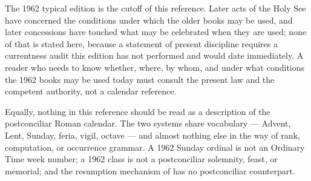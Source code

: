 The 1962 typical edition is the cutoff of this reference. Later acts of the Holy See have
concerned the conditions under which the older books may be used, and later concessions have
touched what may be celebrated when they are used; none of that is stated here, because a
statement of present discipline requires a currentness audit this edition has not performed and
would date immediately. A reader who needs to know whether, where, by whom, and under what
conditions the 1962 books may be used today must consult the present law and the competent
authority, not a calendar reference.

Equally, nothing in this reference should be read as a description of the postconciliar Roman
calendar. The two systems share vocabulary — Advent, Lent, Sunday, feria, vigil, octave — and
almost nothing else in the way of rank, computation, or occurrence grammar. A 1962 Sunday
ordinal is not an Ordinary Time week number; a 1962 class is not a postconciliar solemnity,
feast, or memorial; and the resumption mechanism of  has no postconciliar counterpart.
